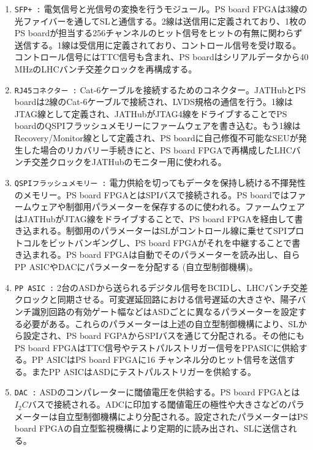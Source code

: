\baselineskip

\begin{enumerate}
    \item \texttt{SFP+ :} 電気信号と光信号の変換を行うモジュール。PS board FPGAは3線の光ファイバーを通してSLと通信する。2線は送信用に定義されており、1枚のPS boardが担当する256チャンネルのヒット信号をヒットの有無に関わらず送信する。1線は受信用に定義されており、コントロール信号を受け取る。コントロール信号にはTTC信号も含まれ、PS boardはシリアルデータから40 MHzのLHCバンチ交差クロックを再構成する。
    \baselineskip

    \item \texttt{RJ45コネクター :} Cat-6ケーブルを接続するためのコネクター。JATHubとPS boardは2線のCat-6ケーブルで接続され、LVDS規格の通信を行う。1線はJTAG線として定義され、JATHubがJTAG4線をドライブすることでPS boardのQSPIフラッシュメモリーにファームウェアを書き込む。もう1線はRecovery/Monitor線として定義され、PS boardに自己修復不可能なSEUが発生した場合のリカバリー手続きにと、PS board FPGAで再構成したLHCバンチ交差クロックをJATHubのモニター用に使われる。
    \baselineskip

    \item \texttt{QSPIフラッシュメモリー :} 電力供給を切ってもデータを保持し続ける不揮発性のメモリー。PS board FPGAとはSPIバスで接続される。PS boardではファームウェアや制御用パラメーターを保存するのに使われる。ファームウェアはJATHubがJTAG線をドライブすることで、PS board FPGAを経由して書き込まれる。制御用のパラメーターはSLがコントロール線に乗せてSPIプロトコルをビットバンギングし、PS board FPGAがそれを中継することで書き込まれる。PS board FPGAは自動でそのパラメーターを読み出し、自らPP ASICやDACにパラメーターを分配する (自立型制御機構)。
    \baselineskip

    \item \texttt{PP ASIC :} 2台のASDから送られるデジタル信号をBCIDし、LHCバンチ交差クロックと同期させる。可変遅延回路における信号遅延の大きさや、陽子バンチ識別回路の有効ゲート幅などはASDごとに異なるパラメーターを設定する必要がある。これらのパラメーターは上述の自立型制御機構により、SLから設定され、PS board FGPAからSPIバスを通じて分配される。その他にもPS board FPGAはTTC信号やテストパルストリガー信号をPPASICに供給する。PP ASICはPS board FPGAに16 チャンネル分のヒット信号を送信する。またPP ASICはASDにテストパルストリガーを供給する。
    \baselineskip            

    \item \texttt{DAC :} ASDのコンパレーターに閾値電圧を供給する。PS board FPGAとは$I_{2}C$バスで接続される。ADCに印加する閾値電圧の極性や大きさなどのパラメーターは自立型制御機構により分配される。設定されたパラメーターはPS board FPGAの自立型監視機構により定期的に読み出され、SLに送信される。
    \baselineskip


\end{enumerate}
